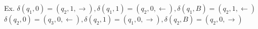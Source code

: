 \begin{frame}

{\footnotesize Ex.
$\delta(q_1,0)=(q_2,1,\rightarrow),
\delta(q_1,1)=(q_2,0,\leftarrow),
\delta(q_1,B)=(q_2,1,\leftarrow)$
$\delta(q_2,0)=(q_3,0,\leftarrow),
\delta(q_2,1)=(q_1,0,\rightarrow),
\delta(q_2,B)=(q_2,0,\rightarrow)$

}
\end{frame}
